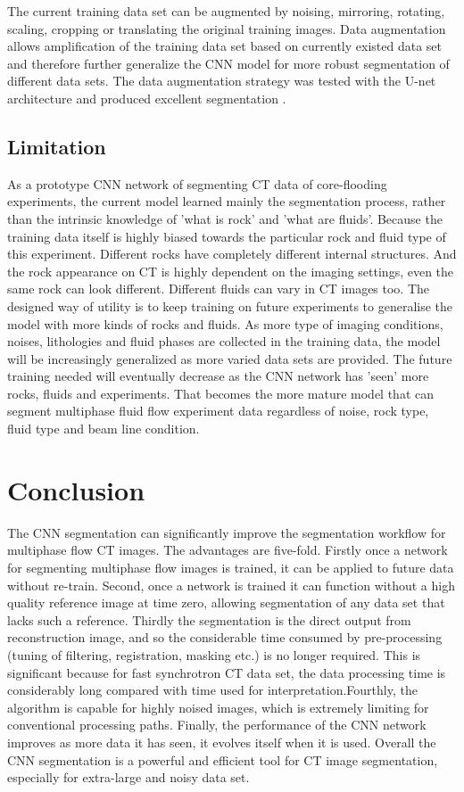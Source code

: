\documentclass[draft,linenumbers]{agujournal2018}
\begin{document}
The current training data set can be augmented by noising, mirroring, rotating, scaling, cropping or translating the original training images. Data augmentation allows amplification of the training data set based on currently existed data set and therefore further generalize the CNN model for more robust segmentation of different data sets. The data augmentation strategy was tested with the U-net architecture and produced excellent segmentation \citep{ronneberger2015u}. 

\subsection{Limitation}
As a prototype CNN network of segmenting CT data of core-flooding experiments, the current model learned mainly the segmentation process, rather than the intrinsic knowledge of 'what is rock' and 'what are fluids'. Because the training data itself is highly biased towards the particular rock and fluid type of this experiment. Different rocks have completely different internal structures. And the rock appearance on CT is highly dependent on the imaging settings, even the same rock can look different. Different fluids can vary in CT images too. The designed way of utility is to keep training on future experiments to generalise the model with more kinds of rocks and fluids. As more type of imaging conditions, noises, lithologies and fluid phases are collected in the training data, the model will be increasingly generalized as more varied data sets are provided. The future training needed will eventually decrease as the CNN network has 'seen' more rocks, fluids and experiments. That becomes the more mature model that can segment multiphase fluid flow experiment data regardless of noise, rock type, fluid type and beam line condition.

\section{Conclusion}
The CNN segmentation can significantly improve the segmentation workflow for multiphase flow \textmu CT images. The advantages are five-fold. Firstly once a network for segmenting multiphase flow images is trained, it can be applied to future data without re-train. Second, once a network is trained it can function without a high quality reference image at time zero, allowing segmentation of any data set that lacks such a reference. Thirdly the segmentation is the direct output from reconstruction image, and so the considerable time consumed by pre-processing (tuning of filtering, registration, masking etc.) is no longer required. This is significant because for fast synchrotron \textmu CT data set, the data processing time is considerably long compared with time used for interpretation.Fourthly, the algorithm is capable for highly noised images, which is extremely limiting for conventional processing paths. Finally, the performance of the CNN network improves as more data it has seen, it evolves itself when it is used. Overall the CNN segmentation is a powerful and efficient tool for \textmu CT image segmentation, especially for extra-large and noisy data set.
\end{document}
